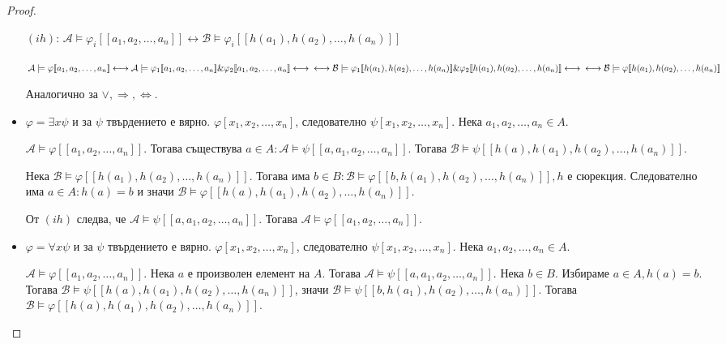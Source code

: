 \documentclass{article}
\begin{document}
\begin{thm}
\begin{proof}
\begin{itemize}
$(ih)$: $\mathcal{A} \models \varphi_i[\![a_1, a_2, \ldots, a_n]\!] \longleftrightarrow \mathcal{B} \models \varphi_i[\![h(a_1), h(a_2), \ldots, h(a_n)]\!]$

$\mathcal{A} \models \varphi[\![a_1, a_2, \ldots, a_n]\!] \longleftrightarrow \mathcal{A} \models \varphi_1[\![a_1, a_2, \ldots, a_n]\!] \& \varphi_2[\![a_1, a_2, \ldots, a_n]\!] \longleftrightarrow \\ \longleftrightarrow \mathcal{B} \models \varphi_1[\![h(a_1), h(a_2), \ldots, h(a_n)]\!] \& \varphi_2[\![h(a_1), h(a_2), \ldots, h(a_n)]\!] \longleftrightarrow \\ \longleftrightarrow \mathcal{B} \models \varphi[\![h(a_1), h(a_2), \ldots, h(a_n)]\!]$

\begin{remark}
Аналогично за $\lor, \Rightarrow, \Leftrightarrow$.
\end{remark}

\item $\varphi = \exists x\psi$ и за $\psi$ твърдението е вярно. $\varphi[x_1, x_2, \ldots, x_n]$, следователно $\psi[x_1, x_2, \ldots, x_n]$. Нека $a_1, a_2, \ldots, a_n \in A$.

$\mathcal{A} \models \varphi[\![a_1, a_2, \ldots, a_n]\!]$. Тогава съществува $a \in A: \mathcal{A} \models \psi[\![a, a_1, a_2, \ldots, a_n]\!]$. Тогава $\mathcal{B} \models \psi[\![h(a), h(a_1), h(a_2), \ldots, h(a_n)]\!]$.

Нека $\mathcal{B} \models \varphi[\![h(a_1), h(a_2), \ldots, h(a_n)]\!]$. Тогава има $b \in B: \mathcal{B} \models \varphi[\![b, h(a_1), h(a_2), \ldots, h(a_n)]\!], h$ е сюрекция. Следователно има $a \in A: h(a) = b$ и значи $\mathcal{B} \models \varphi[\![h(a), h(a_1), h(a_2), \ldots, h(a_n)]\!]$.

От $(ih)$ следва, че $\mathcal{A} \models \psi[\![a, a_1, a_2, \ldots, a_n]\!]$. Тогава $\mathcal{A} \models \varphi[\![a_1, a_2, \ldots, a_n]\!]$.

\item $\varphi = \forall x\psi$ и за $\psi$ твърдението е вярно. $\varphi[x_1, x_2, \ldots, x_n]$, следователно $\psi[x_1, x_2, \ldots, x_n]$. Нека $a_1, a_2, \ldots, a_n \in A$.

$\mathcal{A} \models \varphi[\![a_1, a_2, \ldots, a_n]\!]$. Нека $a$ е произволен елемент на $A$. Тогава $\mathcal{A} \models \psi[\![a, a_1, a_2, \ldots, a_n]\!]$. Нека $b \in B$. Избираме $a \in A, h(a) = b$. Тогава $\mathcal{B} \models \psi[\![h(a), h(a_1), h(a_2), \ldots, h(a_n)]\!]$, значи $\mathcal{B} \models \psi[\![b, h(a_1), h(a_2), \ldots, h(a_n)]\!]$. Тогава $\mathcal{B} \models \varphi[\![h(a), h(a_1), h(a_2), \ldots, h(a_n)]\!]$.


\end{itemize}
\end{proof}
\end{thm}
\end{document}
